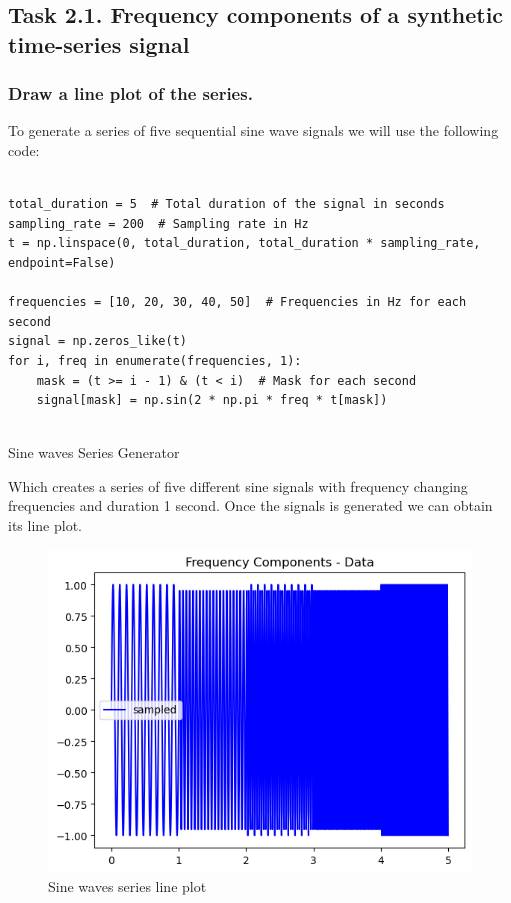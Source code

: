 \documentclass{article}
\begin{document}
\subsection{Task 2.1. Frequency components of a synthetic time-series signal}
\subsubsection{ Draw a line plot of the series.}

To generate a series of five sequential sine wave signals we will use the following code:

\begin{listing}[!ht]
\begin{verbatim}

total_duration = 5  # Total duration of the signal in seconds
sampling_rate = 200  # Sampling rate in Hz
t = np.linspace(0, total_duration, total_duration * sampling_rate, endpoint=False)

frequencies = [10, 20, 30, 40, 50]  # Frequencies in Hz for each second
signal = np.zeros_like(t)
for i, freq in enumerate(frequencies, 1):
    mask = (t >= i - 1) & (t < i)  # Mask for each second
    signal[mask] = np.sin(2 * np.pi * freq * t[mask])
  
\end{verbatim}
\caption{Sine waves Series Generator}
\label{listing:gen_sin}
\end{listing}
Which creates a series of five different sine signals with frequency changing frequencies and duration 1 second. Once the signals is generated we can obtain its line plot.
 \begin{figure}
    \centering \includegraphics[width=0.6\linewidth]{img/stacked_sin/data.png}
    \caption{Sine waves series line plot}
    \label{fig:sine_waves_line}
    \end{figure}
\end{document}
